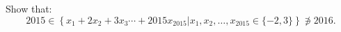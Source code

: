 Show that:
$$ 2015\in\left\{ x_1+2x_2+3x_3\cdots +2015x_{2015}\big| x_1,x_2,\ldots ,x_{2015}\in \{ -2,3\}\right\}\not\ni 2016. $$